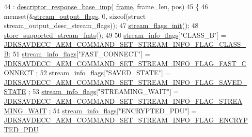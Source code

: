 \begin{DoxyCode}
44                                                                                                            
                            : \hyperlink{classavdecc__lib_1_1descriptor__response__base__imp_aa0e141f3841a15351ed63602ca2e6291}{descriptor\_response\_base\_imp}(
      \hyperlink{gst__avb__playbin_8c_ac8e710e0b5e994c0545d75d69868c6f0}{frame}, frame\_len, pos)
45 \{
46     memset(&\hyperlink{classavdecc__lib_1_1stream__output__descriptor__response__imp_a46da0a71335bf6463cafb4c34ac12e27}{stream\_output\_flags}, 0, \textcolor{keyword}{sizeof}(\textcolor{keyword}{struct} stream\_output\_desc\_stream\_flags));
47     \hyperlink{classavdecc__lib_1_1stream__output__descriptor__response__imp_a61edd2027d6d2e089f949076cc966006}{stream\_flags\_init}();
48     \hyperlink{classavdecc__lib_1_1stream__output__descriptor__response__imp_a66d3a0ab7d0f8bf40bcc903cd9415dcd}{store\_supported\_stream\_fmts}();
49 
50     \hyperlink{classavdecc__lib_1_1stream__output__descriptor__response__imp_a7a5f929ce40eaf804944218314bff706}{stream\_info\_flags}[\textcolor{stringliteral}{"CLASS\_B"}] = 
      \hyperlink{group__command__set__stream__info_ga73b2abb5893265dada589e4d0e2b7875}{JDKSAVDECC\_AEM\_COMMAND\_SET\_STREAM\_INFO\_FLAG\_CLASS\_B};
51     \hyperlink{classavdecc__lib_1_1stream__output__descriptor__response__imp_a7a5f929ce40eaf804944218314bff706}{stream\_info\_flags}[\textcolor{stringliteral}{"FAST\_CONNECT"}] = 
      \hyperlink{group__command__set__stream__info_gacee797af4dd20da0a0912695fe18ef9c}{JDKSAVDECC\_AEM\_COMMAND\_SET\_STREAM\_INFO\_FLAG\_FAST\_CONNECT}
      ;
52     \hyperlink{classavdecc__lib_1_1stream__output__descriptor__response__imp_a7a5f929ce40eaf804944218314bff706}{stream\_info\_flags}[\textcolor{stringliteral}{"SAVED\_STATE"}] = 
      \hyperlink{group__command__set__stream__info_gad640286e76933182ae38245d88f7ad95}{JDKSAVDECC\_AEM\_COMMAND\_SET\_STREAM\_INFO\_FLAG\_SAVED\_STATE}
      ;
53     \hyperlink{classavdecc__lib_1_1stream__output__descriptor__response__imp_a7a5f929ce40eaf804944218314bff706}{stream\_info\_flags}[\textcolor{stringliteral}{"STREAMING\_WAIT"}] = 
      \hyperlink{group__command__set__stream__info_ga69a6deda97cff730b2b2906423ca2770}{JDKSAVDECC\_AEM\_COMMAND\_SET\_STREAM\_INFO\_FLAG\_STREAMING\_WAIT}
      ;
54     \hyperlink{classavdecc__lib_1_1stream__output__descriptor__response__imp_a7a5f929ce40eaf804944218314bff706}{stream\_info\_flags}[\textcolor{stringliteral}{"ENCRYPTED\_PDU"}] = 
      \hyperlink{group__command__set__stream__info_gac418ba4de0c2c8b84186525689c08fce}{JDKSAVDECC\_AEM\_COMMAND\_SET\_STREAM\_INFO\_FLAG\_ENCRYPTED\_PDU}

\end{DoxyCode}
